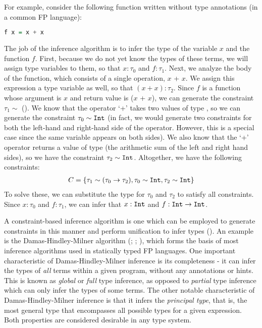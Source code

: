 For example, consider the following function written without type annotations (in a common FP language):
\begin{lstlisting}[label=lst:CSP,language=Haskell,caption=Constraint-based Inference]
f x = x + x
\end{lstlisting}
The job of the inference algorithm is to infer the type of the variable $x$ and the function $f$. First, because we do not yet know the types of these terms, we will assign type variables to them, so that $x:\tau_0$ and $f:\tau_1$. Next, we analyze the body of the function, which consists of a single operation, $x$ + $x$. We assign this expression a type variable as well, so that $(x + x):\tau_2$. Since $f$ is a function whose argument is $x$ and return value is ($x$ + $x$), we can generate the constraint $\tau_1 \sim$ (). We know that the operator `+' takes two values of type \Intt{}, so we can generate the constraint $\tau_0 \sim \texttt{Int}{}$ (in fact, we would generate two constraints for both the left-hand and right-hand side of the operator. However, this is a special case since the same variable appears on both sides). We also know that the `+' operator returns a value of type \Intt{} (the arithmetic sum of the left and right hand sides), so we have the constraint $\tau_2 \sim \texttt{Int}{}$. Altogether, we have the following constraints:
\begin{align*}
C = \{\tau_1 \sim (\tau_0 \rightarrow \tau_2), \tau_0 \sim \texttt{Int}{}, \tau_2 \sim \texttt{Int}{}\}
\end{align*}
To solve these, we can substitute the type \Intt{} for $\tau_0$ and $\tau_2$ to satisfy all constraints. Since $x: \tau_0$ and $f: \tau_1$, we can infer that $x: \texttt{Int}{}$ and $f: \texttt{Int}{} \rightarrow \texttt{Int}{}$.

A constraint-based inference algorithm is one which can be employed to generate constraints in this manner and perform unification to infer types (\cite{krishnamurthi2019}). An example is the Damas-Hindley-Milner algorithm (\cite{damas}; \cite{hindley}; \cite{milner}), which forms the basis of most inference algorithms used in statically typed FP languages. One important characteristic of Damas-Hindley-Milner inference is its completeness - it can infer the types of \textit{all} terms within a given program, without any annotations or hints. This is known as \textit{global} or \textit{full} type inference, as opposed to \textit{partial} type inference which can only infer the types of some terms. The other notable characteristic of Damas-Hindley-Milner inference is that it infers the \textit{principal type}, that is, the most general type that encompasses all possible types for a given expression. Both properties are considered desirable in any type system.
